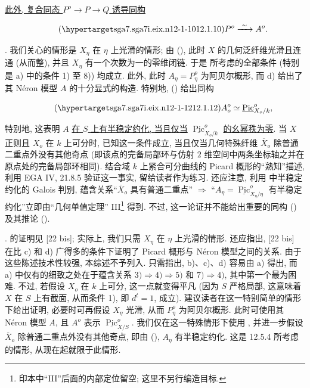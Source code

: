 \noindent
\underline{此外, 复合同态 $P^o\to P\to Q$ 诱导同构}

\begin{equation}\tag{\SGARefTarget{sga7.sga7i.eix.n12-1-10}{12.1.10}}
 P^o\xrightarrow{\ \sim\ }A^o.
\end{equation}

\medskip
\noindent
{}. 我们关心的情形是 $X_\eta$ 在 $\eta$ 上光滑的情形; 由 (), 此时 $X$ 的几何泛纤维光滑且连通 (从而整), 并且 $X_\eta$ 有一个次数为一的零维闭链. 于是  所考虑的全部条件 (特别是 a) 中的条件 1) 至 8)) 均成立. 此外, 此时 $A_\eta=P_\eta^o$ 为阿贝尔概形, 而 d) 给出了其 Néron 模型 $A$ 的十分显式的构造. 特别地, () 给出同构

\begin{equation}\tag{\SGARefTarget{sga7.sga7i.eix.n12-1-12}{12.1.12}}
 A_o^{o}\simeq\underline{\operatorname{Pic}}^o_{X_o/k},
\end{equation}

\noindent
特别地, 这表明 $A$ \underline{在 $S$ 上有半稳定约化, 当且仅当} $\underline{\operatorname{Pic}}^o_{X_o/k}$ \underline{的幺幂秩为零}. 当 $X$ 正则且 $X_o$ 在 $k$ 上可分时, 已知这一条件成立, 当且仅当几何特殊纤维 $\overline X_o$ 除普通二重点外没有其他奇点 (即该点的完备局部环与仿射 $2$ 维空间中两条坐标轴之并在原点处的完备局部环相同). 结合域 $k$ 上紧合可分曲线的 Picard 概形的“熟知”描述, 利用 EGA IV, 21.8.5 验证这一事实, 留给读者作为练习. 还应注意, 利用  中半稳定约化的 Galois 判别, 蕴含关系“$\overline X_o$ 具有普通二重点” $\Longrightarrow$ “$A_\eta=\underline{\operatorname{Pic}}^o_{X_\eta/\eta}$ 有半稳定约化”立即由“几何单值定理” III\footnote{印本中“III”后面的内部定位留空; 这里不另行编造目标.} 得到. 不过, 这一论证并不能给出重要的同构 () 及其推论 ().

\medskip
\noindent
{}.  的证明见 [22 bis]; 实际上, 我们只需 $X_\eta$ 在 $\eta$ 上光滑的情形. 还应指出, [22 bis] 在比  c) 和 d) 广得多的条件下证明了 Picard 概形与 Néron 模型之间的关系. 由于这些陈述技术性较强, 本综述不予列入. 只需指出, b)、c)、d) 容易由 a) 得出, 而 a) 中仅有的细致之处在于蕴含关系 $3)\Longrightarrow4)\Longrightarrow5)$ 和 $7)\Longrightarrow4)$, 其中第一个最为困难. 不过, 若假设 $X_o$ 在 $k$ 上可分, 这一点就变得平凡 (因为 $S$ 严格局部, 这意味着 $X$ 在 $S$ 上有截面, 从而条件 1), 即 $d^t=1$, 成立). 建议读者在这一特别简单的情形下给出证明, 必要时可再假设 $X_\eta$ 光滑, 从而 $P_\eta^o$ 为阿贝尔概形. 此时可使用其 Néron 模型 $A$, 且 $A^o$ 表示 $\underline{\operatorname{Pic}}^o_{X/S}$. 我们仅在这一特殊情形下使用 , 并进一步假设 $\overline X_o$ 除普通二重点外没有其他奇点, 即由 (), $A_\eta$ 有半稳定约化. 这是 12.5.4 所考虑的情形, 从现在起就限于此情形.

